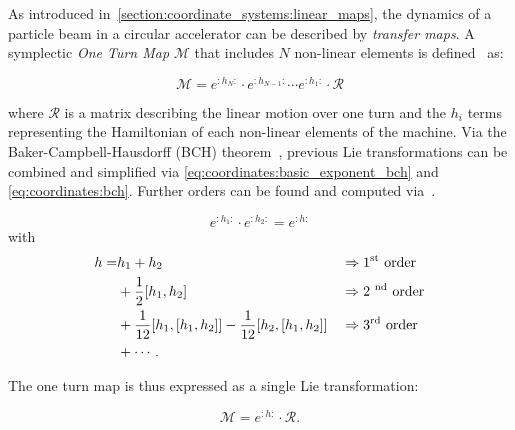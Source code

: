 \subsubsection{}

As introduced in~\ref{section:coordinate_systems:linear_maps}, the dynamics of a particle beam in a circular accelerator can be
described by \textit{transfer maps}. A symplectic \textit{One Turn Map} $\mathcal{M}$ that
includes $N$ non-linear elements is defined~\cite{dragt_overview_2013} as:

\begin{equation}
    \mathcal{M} = e^{:h_N:} \cdot e^{:h_{N-1}:} \cdots e^{:h_1:} \cdot \mathcal{R}
\end{equation}

where $\mathcal{R}$ is a matrix describing the linear motion over one turn and the $h_i$ terms
representing the Hamiltonian of each non-linear elements of the machine.
Via the Baker-Campbell-Hausdorff (BCH) theorem~\cite{forest_beam_1998,casas_efficient_2009},
previous Lie transformations can be combined and simplified via
\cref{eq:coordinates:basic_exponent_bch} and \cref{eq:coordinates:bch}. Further orders can be found
and computed via~\cite{casas_efficient_2009}.

\begin{equation}
    e^{:h_1:} \cdot e^{:h_2:} = e^{:h:}
    \label{eq:coordinates:basic_exponent_bch}
\end{equation}
with 
\begin{equation}
    \begin{alignedat}{3}
      h =& h_1 + h_2  && \Rightarrow \text{1\textsuperscript{st} order}\\
             & + \frac{1}{2} [h_1, h_2]  && \Rightarrow \text{2 \textsuperscript{nd} order}\\
             & + \frac{1}{12} [h_1, [h_1, h_2]] - \frac{1}{12} [h_2, [h_1, h_2]] \quad && \Rightarrow \text{3\textsuperscript{rd} order}\\
             & + \cdots.
    \end{alignedat}
    \label{eq:coordinates:bch}
\end{equation}


The one turn map is thus expressed as a single Lie transformation:

\begin{equation}
    \mathcal{M} = e^{:h:} \cdot \mathcal{R}.
   \label{eq:coordinate_systems:non_linear_map}
\end{equation}

